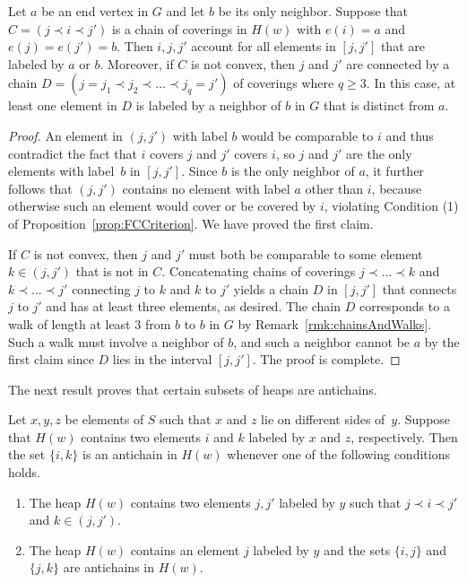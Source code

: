 \documentclass[ALCO,Unicode,published]{cedram}
\begin{document}
\begin{lemma} 
    \label{lemm:horizontal}
    Let $a$ be an end vertex in $G$ and let $b$ be its only neighbor. Suppose that $C=(j\prec i\prec j')$ is
    a chain of coverings in $H(w)$ with $e(i)=a$ and $e(j)=e(j')=b$. Then $i,j,j'$ account for all
    elements in $[j,j']$ that are labeled by $a$ or $b$. Moreover, if $C$ is not convex, then  $j$
    and $j'$ are connected by a chain $D=(j=j_1\prec j_2\prec \dots \prec j_q=j')$ of coverings
    where $q\ge 3$. In this case, at least one element in $D$ is labeled by a neighbor of $b$ in $G$
    that is distinct from $a$.
\end{lemma}

\begin{proof}
    An element in $(j,j')$ with label $b$ would be comparable to $i$ and thus contradict the fact
    that $i$ covers $j$ and $j'$ covers $i$, so $j$ and $j'$ are the only elements with label~$b$ in
    $[j,j']$. Since $b$ is the only neighbor of $a$, it further follows that $(j,j')$ contains no
    element with label $a$ other than $i$, because otherwise such an element would cover or be
    covered by $i$, violating Condition (1) of Proposition~\ref{prop:FCCriterion}. We have proved the first
    claim.

    If $C$ is not convex, then $j$ and $j'$ must both be comparable to some element $k\in (j,j')$
    that is not in $C$.  Concatenating chains of coverings $j\prec \dots \prec k$ and $k\prec \dots
    \prec j'$ connecting $j$ to $k$ and $k$ to $j'$ yields a chain $D$ in $[j,j']$ that connects $j$
    to $j'$ and has at least three elements, as desired. The chain $D$ corresponds to a walk of
    length at least 3 from $b$ to $b$ in $G$ by Remark~\ref{rmk:chainsAndWalks}. Such a walk must involve
    a neighbor of $b$, and such a neighbor cannot be $a$ by the first claim since $D$ lies in the
    interval $[j,j']$. The proof is complete.
\end{proof}


The next result proves that certain subsets of heaps are antichains.

\begin{lemma}
    Let $x,y,z$ be elements of $S$ such that $x$ and $z$ lie on different sides of~$y$.  Suppose
    that $H(w)$ contains two elements $i$ and $k$ labeled by $x$ and $z$, respectively. Then the set
    $\{i,k\}$ is an antichain in $H(w)$ whenever one of the following conditions holds.
    \begin{enumerate}
        \item The heap $H(w)$ contains two elements $j,j'$ labeled by $y$ such that $j\prec i\prec
             j'$ and $k\in (j,j')$. 
        \item The heap $H(w)$ contains an element $j$ labeled by $y$ and the sets $\{i,j\}$ and
             $\{j,k\}$ are antichains in $H(w)$. 
    \end{enumerate}
    \label{lemm:3chain}
\end{lemma}
\end{document}
